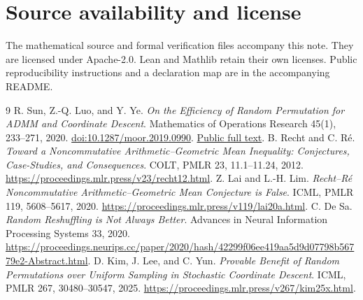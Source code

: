 \documentclass[11pt]{article}
\begin{document}
\section*{Source availability and license}
The mathematical source and formal verification files accompany this note. They are licensed under Apache-2.0. Lean and Mathlib retain their own licenses. Public reproducibility instructions and a declaration map are in the accompanying README.

\clearpage
\begin{thebibliography}{9}
 R. Sun, Z.-Q. Luo, and Y. Ye.
\emph{On the Efficiency of Random Permutation for ADMM and Coordinate Descent}.
Mathematics of Operations Research 45(1), 233--271, 2020.
\href{https://doi.org/10.1287/moor.2019.0990}{doi:10.1287/moor.2019.0990}.
\href{https://par.nsf.gov/servlets/purl/10201446}{Public full text}.
 B. Recht and C. R\'e.
\emph{Toward a Noncommutative Arithmetic--Geometric Mean Inequality: Conjectures, Case-Studies, and Consequences}.
COLT, PMLR 23, 11.1--11.24, 2012.
\url{https://proceedings.mlr.press/v23/recht12.html}.
 Z. Lai and L.-H. Lim.
\emph{Recht--R\'e Noncommutative Arithmetic--Geometric Mean Conjecture is False}.
ICML, PMLR 119, 5608--5617, 2020.
\url{https://proceedings.mlr.press/v119/lai20a.html}.
 C. De Sa.
\emph{Random Reshuffling is Not Always Better}.
Advances in Neural Information Processing Systems 33, 2020.
\url{https://proceedings.neurips.cc/paper/2020/hash/42299f06ee419aa5d9d07798b56779e2-Abstract.html}.
 D. Kim, J. Lee, and C. Yun.
\emph{Provable Benefit of Random Permutations over Uniform Sampling in Stochastic Coordinate Descent}.
ICML, PMLR 267, 30480--30547, 2025.
\url{https://proceedings.mlr.press/v267/kim25x.html}.
\end{thebibliography}
\end{document}
